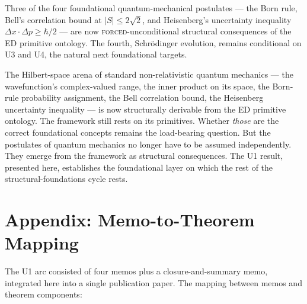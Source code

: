 \documentclass[11pt,a4paper]{article}
\begin{document}
Three of the four foundational quantum-mechanical postulates --- the Born rule, Bell's correlation bound at $|S| \leq 2\sqrt{2}$, and Heisenberg's uncertainty inequality $\Delta x \cdot \Delta p \geq \hbar/2$ --- are now \textsc{forced}-unconditional structural consequences of the ED primitive ontology. The fourth, Schr\"odinger evolution, remains conditional on U3 and U4, the natural next foundational targets.

The Hilbert-space arena of standard non-relativistic quantum mechanics --- the wavefunction's complex-valued range, the inner product on its space, the Born-rule probability assignment, the Bell correlation bound, the Heisenberg uncertainty inequality --- is now structurally derivable from the ED primitive ontology. The framework still rests on its primitives. Whether \emph{those} are the correct foundational concepts remains the load-bearing question. But the postulates of quantum mechanics no longer have to be assumed independently. They emerge from the framework as structural consequences. The U1 result, presented here, establishes the foundational layer on which the rest of the structural-foundations cycle rests.

\section*{Appendix: Memo-to-Theorem Mapping}

The U1 arc consisted of four memos plus a closure-and-summary memo, integrated here into a single publication paper. The mapping between memos and theorem components:
\end{document}
